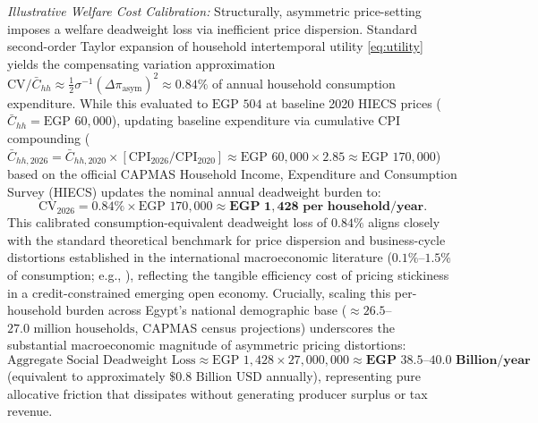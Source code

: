 \documentclass[review,12pt]{elsarticle}
\begin{document}
\textit{Illustrative Welfare Cost Calibration:} Structurally, asymmetric price-setting imposes a welfare deadweight loss via inefficient price dispersion. Standard second-order Taylor expansion of household intertemporal utility \eqref{eq:utility} yields the compensating variation approximation $\text{CV}/\bar{C}_{hh} \approx \frac{1}{2}\sigma^{-1}(\Delta\pi_{\text{asym}})^2 \approx 0.84\%$ of annual household consumption expenditure. While this evaluated to $\text{EGP } 504$ at baseline 2020 HIECS prices ($\bar{C}_{hh} = \text{EGP } 60{,}000$), updating baseline expenditure via cumulative CPI compounding ($\bar{C}_{hh, 2026} = \bar{C}_{hh, 2020} \times [\text{CPI}_{2026}/\text{CPI}_{2020}] \approx \text{EGP } 60{,}000 \times 2.85 \approx \text{EGP } 170{,}000$) based on the official CAPMAS Household Income, Expenditure and Consumption Survey (HIECS) updates the nominal annual deadweight burden to:
\begin{equation}
\text{CV}_{2026} = 0.84\% \times \text{EGP } 170{,}000 \approx \mathbf{\text{EGP } 1{,}428 \text{ per household/year.}}
\end{equation}
This calibrated consumption-equivalent deadweight loss of $0.84\%$ aligns closely with the standard theoretical benchmark for price dispersion and business-cycle distortions established in the international macroeconomic literature ($0.1\%$--$1.5\%$ of consumption; e.g., \citealp{lucas1987, woodford2003, gali2008}), reflecting the tangible efficiency cost of pricing stickiness in a credit-constrained emerging open economy. Crucially, scaling this per-household burden across Egypt's national demographic base ($\approx 26.5$--$27.0\text{ million households}$, CAPMAS census projections) underscores the substantial macroeconomic magnitude of asymmetric pricing distortions:
\begin{equation}
\text{Aggregate Social Deadweight Loss} \approx \text{EGP } 1{,}428 \times 27{,}000{,}000 \approx \mathbf{\text{EGP } 38.5\text{--}40.0\text{ Billion/year}}
\label{eq:aggregate_welfare}
\end{equation}
(equivalent to approximately $\$0.8\text{ Billion USD}$ annually), representing pure allocative friction that dissipates without generating producer surplus or tax revenue.
\end{document}
